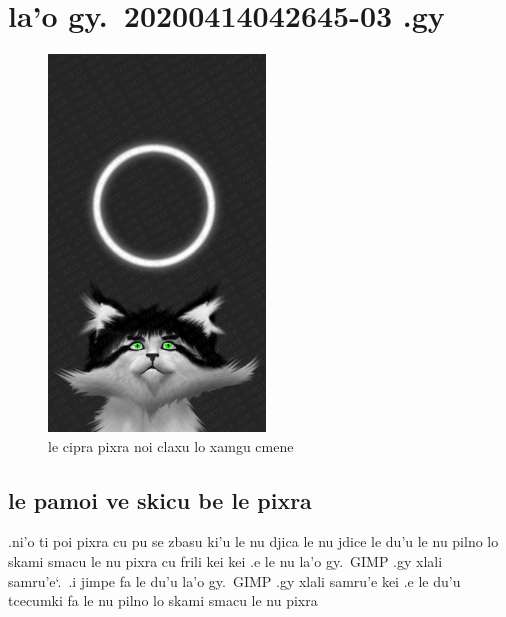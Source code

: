 \documentclass{report}
\newcommand\imageheight{10cm}
\newcommand\sds{\spacefactor\sfcode`.\ \space}
\begin{document}
\chapter{la'o gy.\ 20200414042645-03 .gy}
\begin{figure}[ht]
	\centering
	\includegraphics[height=\imageheight]{20200414042645-03/20200414042645-03.jpg}
	\caption[center]{le cipra pixra noi claxu lo xamgu cmene}
\end{figure}
\section{le pamoi ve skicu be le pixra}
.ni'o ti poi pixra cu pu se zbasu ki'u le nu djica le nu jdice le du'u le nu pilno lo skami smacu le nu pixra cu frili kei kei .e le nu la'o gy.\ GIMP .gy xlali samru'e\sds  .i jimpe fa le du'u la'o gy.\ GIMP .gy xlali samru'e kei .e le du'u tcecumki fa le nu pilno lo skami smacu le nu pixra
\end{document}
